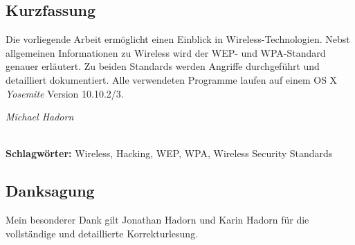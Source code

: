 
\subsection*{Kurzfassung}
Die vorliegende Arbeit ermöglicht einen Einblick in Wireless-Technologien.
Nebst allgemeinen Informationen zu Wireless wird der WEP- und WPA-Standard genauer erläutert.
Zu beiden Standards werden Angriffe durchgeführt und detailliert dokumentiert.
Alle verwendeten Programme laufen auf einem OS X \textit{Yosemite} Version 10.10.2/3.
\begin{flushright}
	\textit{Michael Hadorn}	
\end{flushright}


%
\mbox{}\\[0.5\baselineskip]\noindent
\textbf{Schlagwörter:} 
Wireless, Hacking, WEP, WPA, Wireless Security Standards

\vfill
\subsection*{Danksagung}
Mein besonderer Dank gilt Jonathan Hadorn und Karin Hadorn für die vollständige und detaillierte Korrekturlesung.
